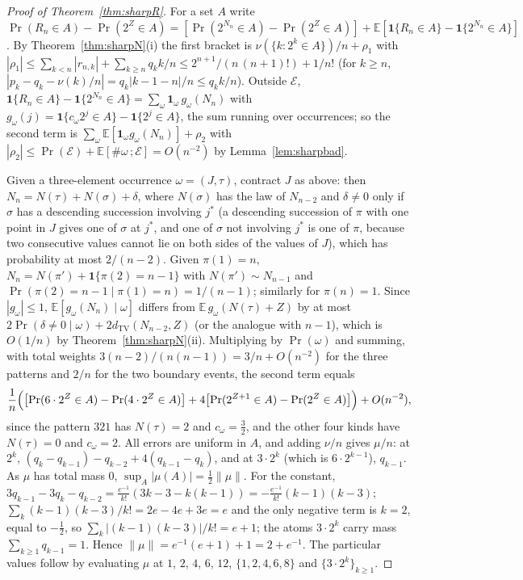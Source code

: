\documentclass[11pt,a4paper]{article}
\theoremstyle{plain}
\theoremstyle{definition}
\theoremstyle{remark}
\begin{document}
\begin{proof}[Proof of Theorem~\ref{thm:sharpR}]
For a set $A$ write $\Pr(R_n\in A)-\Pr(2^Z\in A)=[\Pr(2^{N_n}\in A)-\Pr(2^Z\in A)]+\mathbb E[\mathbf 1\{R_n\in A\}-\mathbf 1\{2^{N_n}\in A\}]$. By Theorem~\ref{thm:sharpN}(i) the first bracket is $\nu(\{k:2^k\in A\})/n+\rho_1$ with $|\rho_1|\le\sum_{k<n}|r_{n,k}|+\sum_{k\ge n}q_kk/n\le2^{n+1}/(n\,(n+1)!)+1/n!$ (for $k\ge n$, $|p_k-q_k-\nu(k)/n|=q_k|k-1-n|/n\le q_kk/n$). Outside $\mathcal E$, $\mathbf 1\{R_n\in A\}-\mathbf 1\{2^{N_n}\in A\}=\sum_\omega\mathbf 1_\omega\,g_\omega(N_n)$ with $g_\omega(j)=\mathbf 1\{c_\omega2^j\in A\}-\mathbf 1\{2^j\in A\}$, the sum running over occurrences; so the second term is $\sum_\omega\mathbb E[\mathbf 1_\omega g_\omega(N_n)]+\rho_2$ with $|\rho_2|\le\Pr(\mathcal E)+\mathbb E[\#\omega\,;\mathcal E]=O(n^{-2})$ by Lemma~\ref{lem:sharpbad}.

Given a three-element occurrence $\omega=(J,\tau)$, contract $J$ as above: then $N_n=N(\tau)+N(\sigma)+\delta$, where $N(\sigma)$ has the law of $N_{n-2}$ and $\delta\ne0$ only if $\sigma$ has a descending succession involving $j^*$ (a descending succession of $\pi$ with one point in $J$ gives one of $\sigma$ at $j^*$, and one of $\sigma$ not involving $j^*$ is one of $\pi$, because two consecutive values cannot lie on both sides of the values of $J$), which has probability at most $2/(n-2)$. Given $\pi(1)=n$, $N_n=N(\pi')+\mathbf 1\{\pi(2)=n-1\}$ with $N(\pi')\sim N_{n-1}$ and $\Pr(\pi(2)=n-1\mid\pi(1)=n)=1/(n-1)$; similarly for $\pi(n)=1$. Since $|g_\omega|\le1$, $\mathbb E[g_\omega(N_n)\mid\omega]$ differs from $\mathbb E\,g_\omega(N(\tau)+Z)$ by at most $2\Pr(\delta\ne0\mid\omega)+2d_{\mathrm{TV}}(N_{n-2},Z)$ (or the analogue with $n-1$), which is $O(1/n)$ by Theorem~\ref{thm:sharpN}(ii). Multiplying by $\Pr(\omega)$ and summing, with total weights $3(n-2)/(n(n-1))=3/n+O(n^{-2})$ for the three patterns and $2/n$ for the two boundary events, the second term equals
\[
\frac1n\Bigl(\bigl[\Pr(6\cdot2^Z\in A)-\Pr(4\cdot2^Z\in A)\bigr]+4\bigl[\Pr(2^{Z+1}\in A)-\Pr(2^Z\in A)\bigr]\Bigr)+O(n^{-2}),
\]
since the pattern $321$ has $N(\tau)=2$ and $c_\omega=\tfrac32$, and the other four kinds have $N(\tau)=0$ and $c_\omega=2$. All errors are uniform in $A$, and adding $\nu/n$ gives $\mu/n$: at $2^k$, $(q_k-q_{k-1})-q_{k-2}+4(q_{k-1}-q_k)$, and at $3\cdot2^k$ (which is $6\cdot2^{k-1}$), $q_{k-1}$. As $\mu$ has total mass $0$, $\sup_A|\mu(A)|=\tfrac12\lVert\mu\rVert$. For the constant, $3q_{k-1}-3q_k-q_{k-2}=\frac{e^{-1}}{k!}(3k-3-k(k-1))=-\frac{e^{-1}}{k!}(k-1)(k-3)$; $\sum_k(k-1)(k-3)/k!=2e-4e+3e=e$ and the only negative term is $k=2$, equal to $-\tfrac12$, so $\sum_k|(k-1)(k-3)|/k!=e+1$; the atoms $3\cdot2^k$ carry mass $\sum_{k\ge1}q_{k-1}=1$. Hence $\lVert\mu\rVert=e^{-1}(e+1)+1=2+e^{-1}$. The particular values follow by evaluating $\mu$ at $1$, $2$, $4$, $6$, $12$, $\{1,2,4,6,8\}$ and $\{3\cdot2^k\}_{k\ge1}$.
\end{proof}
\end{document}
